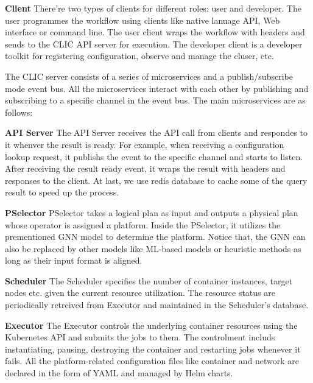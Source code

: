 \textbf{Client}  There're two types of clients for different roles: user and developer. The user programmes the workflow using clients like native lanuage API, Web interface or command line. The user client wraps the workflow with headers and sends to the CLIC API server for execution. The developer client is a developer toolkit for registering configuration, observe and manage the cluser, etc.

The CLIC server consists of a series of microservices and a publish/subscribe mode event bus. All the microservices interact with each other by publishing and subscribing to a specific channel in the event bus. The main microservices are as follows:

\textbf{API Server}  The API Server receives the API call from clients and respondes to it whenver the result is ready. For example, when receiving a configuration lookup request, it publishs the event to the specific channel and starts to listen. After receiving the result ready event, it wraps the result with headers and responses to the client. At last, we use redis database to cache some of the query result to speed up the process.

\textbf{PSelector}   PSelector takes a logical plan as input and outputs a physical plan whose operator is assigned a platform. Inside the PSelector, it utilizes the prementioned GNN model to determine the platform. Notice that, the GNN can also be replaced by other models like ML-based models or heuristic methods as long as their input format is aligned.

\textbf{Scheduler}   The Scheduler specifies the number of container instances, target nodes etc. given the current resource utilization. The resource status are periodically retreived from Executor and maintained in the Scheduler's database.

\textbf{Executor}    The Executor controls the underlying container resources using the Kubernetes API and submits the jobs to them. The controlment includs instantiating, pausing, destroying the container and restarting jobs whenever it fails. All the platform-related configuration files like container and network are declared in the form of YAML and managed by Helm charts.
\fi

